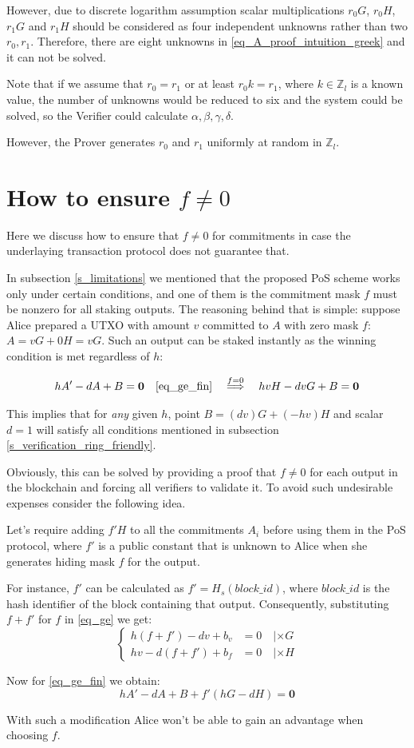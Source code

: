 \documentclass{article}
\numberwithin{figure}{section}
\begin{document}
However, due to discrete logarithm assumption scalar multiplications $r_0 G$, $r_0 H$, $r_1 G$ and $r_1 H$ should be considered as four independent unknowns rather than two $r_0, r_1$. Therefore, there are eight unknowns in \eqref{eq_A_proof_intuition_greek} and it can not be solved.

Note that if we assume that $r_0 = r_1$ or at least $r_0 k = r_1$, where $k \in \mathbb{Z}_l$ is a known value, the number of unknowns would be reduced to six and the system could be solved, so the Verifier could calculate $\alpha, \beta, \gamma, \delta$.

However, the Prover generates $r_0$ and $r_1$ uniformly at random in $\mathbb{Z}_l$.


\newpage
\section{How to ensure $f \neq 0$}

Here we discuss how to ensure that $f \neq 0$ for commitments in case the underlaying transaction protocol does not guarantee that.

In subsection \ref{s_limitations} we mentioned that the proposed PoS scheme works only under certain conditions, and one of them is the commitment mask $f$ must be nonzero for all staking outputs. The reasoning behind that is simple: suppose Alice prepared a UTXO with amount $v$ committed to $A$ with zero mask $f$: $A = vG + 0H = vG$. Such an output can be staked instantly as the winning condition is met regardless of $h$:

\[ hA' - dA + B = \mathbf{0} \quad \eqref{eq_ge_fin} \quad \stackrel{f = 0}{\Longrightarrow} \quad hvH - dvG + B = \mathbf{0} \]

This implies that for \textit{any} given $h$, point $B = (dv)G + (-hv)H$ and scalar $d = 1$ will satisfy all conditions mentioned in subsection \ref{s_verification_ring_friendly}.

Obviously, this can be solved by providing a proof that $f \neq 0$ for each output in the blockchain and forcing all verifiers to validate it. To avoid such undesirable expenses consider the following idea.

Let's require adding $f'H$ to all the commitments $A_i$ before using them in the PoS protocol, where $f'$ is a public constant that is unknown to Alice when she generates hiding mask $f$ for the output.

For instance, $f'$ can be calculated as $f' = H_s(block\_id)$, where $block\_id$ is the hash identifier of the block containing that output.
Consequently, substituting $f+f'$ for $f$ in \eqref{eq_ge} we get:
\begin{equation*}
\left\{ \begin{aligned} 
  h (f + f') - d v + b_v &= 0 \quad | \times G \\
  h v - d (f + f') + b_f &= 0 \quad | \times H
\end{aligned} \right.
\end{equation*}

Now for \eqref{eq_ge_fin} we obtain:
\[ hA' - dA + B + f'(hG - dH) = \mathbf{0} \]

With such a modification Alice won't be able to gain an advantage when choosing $f$.
\end{document}
